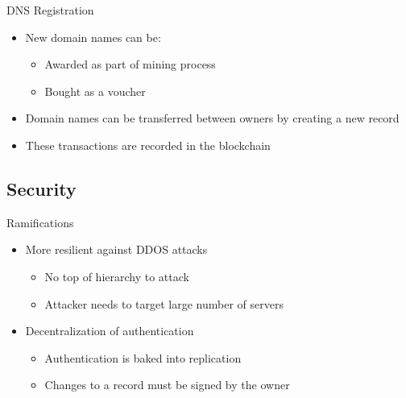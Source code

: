 \documentclass[11pt]{beamer}
\begin{document}
\begin{frame}{DNS Registration}
	\begin{itemize}
		\item New domain names can be:
		\begin{itemize}
			\item Awarded as part of mining process
			\item Bought as a voucher
		\end{itemize}
		\item Domain names can be transferred between owners by creating a new record
		\item These transactions are recorded in the blockchain
	\end{itemize}	
\end{frame}

\subsection{Security}

\begin{frame}{Ramifications}

\begin{itemize}
	\item More resilient against DDOS attacks
	\begin{itemize}
		\item No top of hierarchy to attack
		\item Attacker needs to target large number of servers
	\end{itemize}
	\item Decentralization of authentication
	\begin{itemize}
		\item Authentication is baked into replication
		\item Changes to a record must be signed by the owner
	\end{itemize}
\end{itemize}	
	
	
\end{frame}
\end{document}

